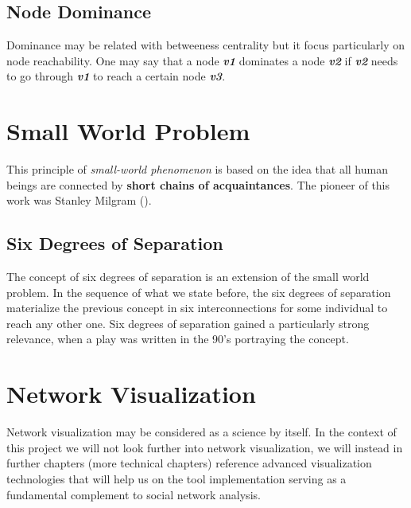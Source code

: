 \subsection{Node Dominance}
Dominance may be related with betweeness centrality but it focus particularly on node reachability. One may say that a node \textit{\textbf{v1}} dominates
a node \textit{\textbf{v2}} if \textit{\textbf{v2}} needs to go through \textit{\textbf{v1}} to reach a certain node \textit{\textbf{v3}}.

\section{Small World Problem}
This principle of \textit{small-world phenomenon} is based on the idea that all human beings are connected by \textbf{short chains of acquaintances}. The pioneer of this work was Stanley Milgram (\cite{travers1967small}).

\subsection*{Six Degrees of Separation}
The concept of six degrees of separation is an extension of the small world problem. In the sequence of what we state before, the six degrees of separation materialize the previous concept in six interconnections for some individual to reach any other one. Six degrees of separation gained a particularly strong relevance, when a play was written in the 90's portraying the concept.

\section{Network Visualization}
Network visualization may be considered as a science by itself. In the context of this project we will not look further into network visualization, we will instead
in further chapters (more technical chapters) reference advanced visualization technologies that will help us on the tool implementation serving as a fundamental complement to social network analysis.

